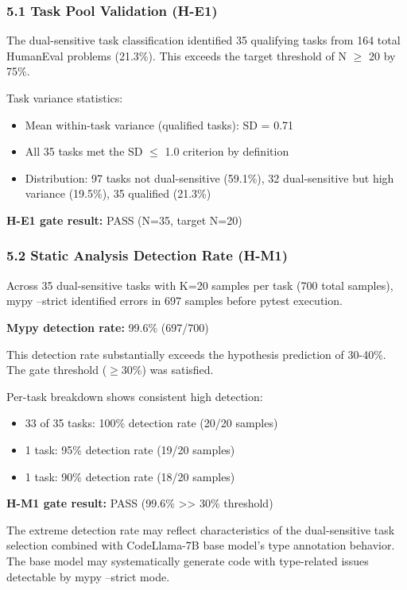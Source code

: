 
\subsubsection{5.1 Task Pool Validation (H-E1)}

The dual-sensitive task classification identified 35 qualifying tasks from 164 total HumanEval problems (21.3\%). This exceeds the target threshold of N $\geq$ 20 by 75\%.

Task variance statistics:
\begin{itemize}
\item Mean within-task variance (qualified tasks): SD = 0.71
\item All 35 tasks met the SD $\leq$ 1.0 criterion by definition
\item Distribution: 97 tasks not dual-sensitive (59.1\%), 32 dual-sensitive but high variance (19.5\%), 35 qualified (21.3\%)
\end{itemize}

\textbf{H-E1 gate result:} PASS (N=35, target N=20)

\subsubsection{5.2 Static Analysis Detection Rate (H-M1)}

Across 35 dual-sensitive tasks with K=20 samples per task (700 total samples), mypy --strict identified errors in 697 samples before pytest execution.

\textbf{Mypy detection rate:} 99.6\% (697/700)

This detection rate substantially exceeds the hypothesis prediction of 30-40\%. The gate threshold ($\geq 30$\%) was satisfied.

Per-task breakdown shows consistent high detection:
\begin{itemize}
\item 33 of 35 tasks: 100\% detection rate (20/20 samples)
\item 1 task: 95\% detection rate (19/20 samples)
\item 1 task: 90\% detection rate (18/20 samples)
\end{itemize}

\textbf{H-M1 gate result:} PASS (99.6\% >> 30\% threshold)

The extreme detection rate may reflect characteristics of the dual-sensitive task selection combined with CodeLlama-7B base model's type annotation behavior. The base model may systematically generate code with type-related issues detectable by mypy --strict mode.

